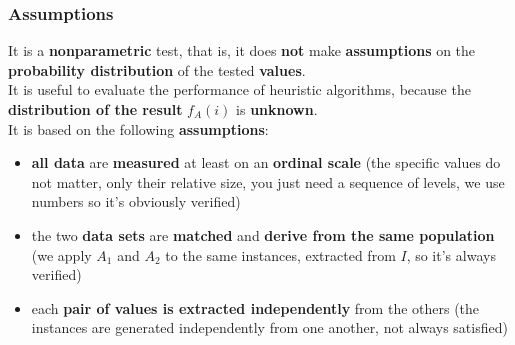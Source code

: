 \documentclass[11pt]{article}
\begin{document}
	\newpage
	
	\subsubsection{Assumptions} 
	It is a \textbf{nonparametric} test, that is, it does \textbf{not} make \textbf{assumptions} on the \textbf{probability distribution} of the tested \textbf{values}.\\
	
	It is useful to evaluate the performance of heuristic algorithms, because the \textbf{distribution of the result} $f_A (i )$ is \textbf{unknown}. \\
	
	It is based on the following \textbf{assumptions}:
	\begin{itemize}
		\item \textbf{all data} are \textbf{measured} at least on an \textbf{ordinal scale} (the specific values do not matter, only their relative size, you just need a sequence of levels, we use numbers so it's obviously verified)
		\item the two \textbf{data sets} are \textbf{matched} and \textbf{derive from the same population} (we apply $A_1$ and $A_2$ to the same instances, extracted from $I$, so it's always verified)
		\item each \textbf{pair of values is extracted independently} from the others (the instances are generated independently from one another, not always satisfied)
	\end{itemize}
	
	\newpage
	
\end{document}
